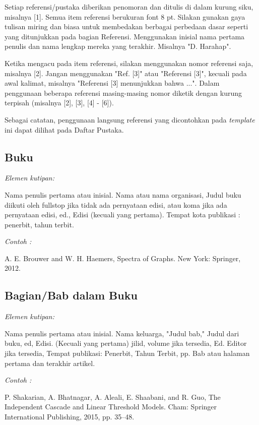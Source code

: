 \documentclass[conference, a4paper]{IEEEtran_ID}
\begin{document}
	Setiap referensi/pustaka diberikan penomoran dan ditulis di dalam kurung siku, misalnya [1]. Semua item referensi berukuran font 8 pt. Silakan gunakan gaya tulisan miring dan biasa untuk membedakan berbagai perbedaan dasar seperti yang ditunjukkan pada bagian Referensi. Menggunakan inisial nama pertama penulis dan nama lengkap mereka yang terakhir. Misalnya "D. Harahap".

	Ketika mengacu pada item referensi, silakan menggunakan nomor referensi saja, misalnya [2]. Jangan menggunakan "Ref. [3]" atau "Referensi [3]", kecuali pada awal kalimat, misalnya "Referensi [3] menunjukkan bahwa ...". Dalam penggunaan beberapa referensi masing-masing nomor diketik dengan kurung terpisah (misalnya [2], [3], [4] - [6]).

	Sebagai catatan, penggunaan langsung referensi yang dicontohkan pada \textit{template} ini dapat dilihat pada Daftar Pustaka. \cite{pustaka1,pustaka2,pustaka3,pustaka4,pustaka5}

\subsection{Buku}

	\textit{Elemen kutipan:}

	Nama penulis pertama atau inisial. Nama atau nama organisasi, Judul buku diikuti oleh fullstop jika tidak ada pernyataan edisi, atau koma jika ada pernyataan edisi, ed., Edisi (kecuali yang pertama). Tempat kota publikasi : penerbit, tahun terbit.

	\textit{Contoh \cite{pustaka1}:}

	A. E. Brouwer and W. H. Haemers, Spectra of Graphs. New York: Springer, 2012.

\subsection{Bagian/Bab dalam Buku}

	\textit{Elemen kutipan:}

	Nama penulis pertama atau inisial. Nama keluarga, "Judul bab," Judul dari buku, ed, Edisi. (Kecuali yang pertama)  jilid, volume jika tersedia, Ed. Editor jika tersedia, Tempat publikasi: Penerbit, Tahun Terbit, pp. Bab atau halaman pertama dan terakhir artikel.

	\textit{Contoh \cite{pustaka2}:}

	P. Shakarian, A. Bhatnagar, A. Aleali, E. Shaabani, and R. Guo, The Independent Cascade and Linear Threshold Models. Cham: Springer International Publishing, 2015, pp. 35–48.
\end{document}
